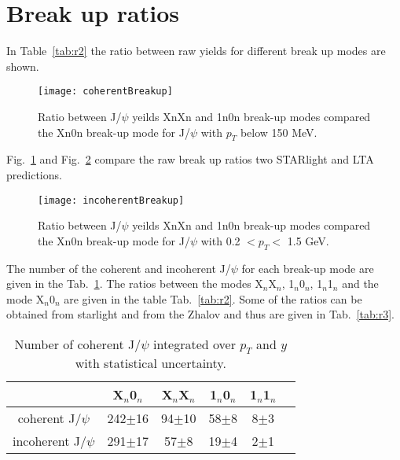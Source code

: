   \section{Break up ratios}
    In Table~\ref{tab:r2} the ratio between raw yields for different break up 
      modes are shown.
    \begin{figure}[!Hhtb]
      \centering
      \texttt{[image: coherentBreakup]}
      \caption{Ratio between J/$\psi$ yeilds XnXn and 1n0n break-up modes 
        compared the Xn0n break-up mode for J/$\psi$ with $p_{T}$ below 150 
        MeV.}
      \label{fig:coherentBreakUp}
    \end{figure}

    Fig.~\ref{fig:coherentBreakUp} and Fig.~\ref{fig:incoherentBreakUp} compare
      the raw break up ratios two STARlight and LTA predictions. 
    \begin{figure}[!Hhtb]
      \centering
      \texttt{[image: incoherentBreakup]}
      \caption{Ratio between J/$\psi$ yeilds XnXn and 1n0n break-up modes 
        compared the Xn0n break-up mode for J/$\psi$ with 0.2 $< p_{T} <$ 
        1.5 GeV.}
      \label{fig:incoherentBreakUp}
    \end{figure}

    The number of the coherent and incoherent J/$\psi$ for each break-up mode are
      given in the Tab.~\ref{tab:r1}. 
    The ratios between the modes X$_{n}$X$_{n}$, 1$_{n}$0$_{n}$, 1$_{n}$1$_{n}$ and
      the mode  X$_{n}$0$_{n}$ are given in the table Tab.~\ref{tab:r2}. 
    Some of the  ratios can be obtained from  {\sc starlight} and from the Zhalov 
      and thus are given in Tab.~\ref{tab:r3}.
    \begin{table}[h]
      \begin{center}
      \begin{tabular}{|c|c|c|c|c|c|}
        \hline
         &  X$_{n}$0$_{n}$& X$_{n}$X$_{n}$ & 1$_{n}$0$_{n}$ & 1$_{n}$1$_{n}$  \\ \hline
        coherent J/$\psi$ &  242$\pm$16&94$\pm$10&58$\pm$8&8$\pm$3\\ \hline
        incoherent J/$\psi$ & 291$\pm$17&57$\pm$8&19$\pm$4&2$\pm$1\\ \hline
      \end{tabular}
      \caption{\label{tab:r1} Number of coherent J/$\psi$ integrated over $p_{T}$ and $y$ 
        with statistical uncertainty.}
      \end{center}
    \end{table}

